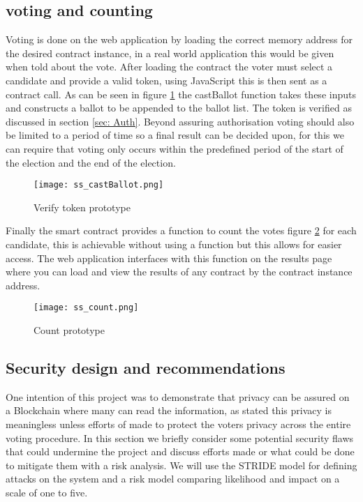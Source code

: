 \documentclass{entcs}
\begin{document}
\subsection{voting and counting}
Voting is done on the web application by loading the correct memory address for the desired contract instance, in a real world application this would be given when told about the vote. After loading the contract the voter must select a candidate and provide a valid token, using JavaScript this is then sent as a contract call. As can be seen in figure \ref{fig:castBallot} the castBallot function takes these inputs and constructs a ballot to be appended to the ballot list. The token is verified as discussed in section \ref{sec: Auth}. 
Beyond assuring authorisation voting should also be limited to a period of time so a final result can be decided upon, for this we can require that voting only occurs within the predefined period of the start of the election and the end of the election.
\begin{figure}[h!]
    \centering
    \texttt{[image: ss\_castBallot.png]}
    \caption{Verify token prototype}
    \label{fig:castBallot}
\end{figure}

Finally the smart contract provides a function to count the votes figure \ref{fig:count} for each candidate, this is achievable without using a function but this allows for easier access. The web application interfaces with this function on the results page where you can load and view the results of any contract by the contract instance address.
\begin{figure}[h!]
    \centering
    \texttt{[image: ss\_count.png]}
    \caption{Count prototype}
    \label{fig:count}
\end{figure}

\subsection{Security design and recommendations}
One intention of this project was to demonstrate that privacy can be assured on a Blockchain where many can read the information, as stated this privacy is meaningless unless efforts of made to protect the voters privacy across the entire voting procedure. In this section we briefly consider some potential security flaws that could undermine the project and discuss efforts made or what could be done to mitigate them with a risk analysis. We will use the STRIDE model \cite{STRIDE} for defining attacks on the system and a risk model comparing likelihood and impact on a scale of one to five.
\end{document}
